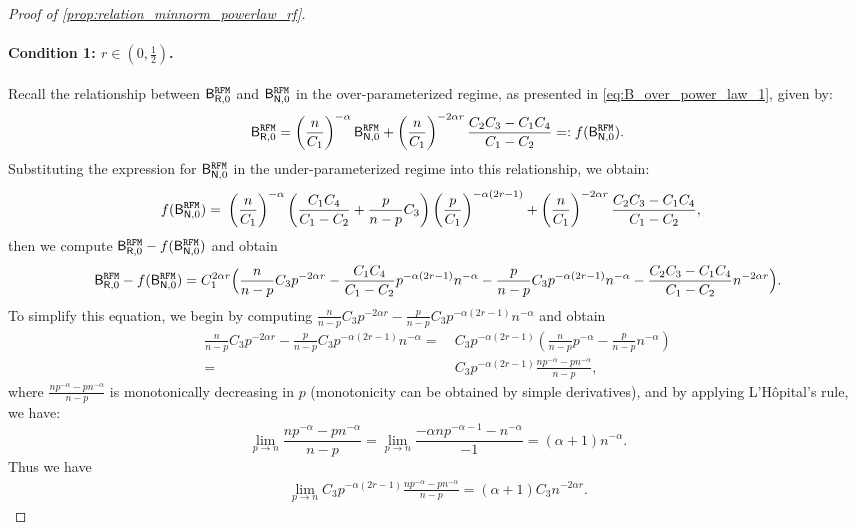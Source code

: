 \begin{proof}[Proof of \cref{prop:relation_minnorm_powerlaw_rf}]
\paragraph{Condition 1: $r \in (0, \frac{1}{2})$.}
Recall the relationship between $\mathsf B_{\mathsf R,0}^{\tt RFM}$ and $\mathsf B_{\mathsf N,0}^{\tt RFM}$ in the over-parameterized regime, as presented in \cref{eq:B_over_power_law_1}, given by: 
\[
\begin{aligned}
\mathsf B_{\mathsf R,0}^{\tt RFM} = \left(\frac{n}{C_1}\right)^{-\alpha} \mathsf B_{\mathsf N,0}^{\tt RFM} + \left(\frac{n}{C_1}\right)^{-2\alpha r}\frac{C_2C_3-C_1C_4}{C_1-C_2} =: f(\mathsf B_{\mathsf N,0}^{\tt RFM}).
\end{aligned}
\]
Substituting the expression for $\mathsf B_{\mathsf N,0}^{\tt RFM}$ in the under-parameterized regime into this relationship, we obtain:
\[
\begin{aligned}
f(\mathsf B_{\mathsf N,0}^{\tt RFM}) =&~ \left(\frac{n}{C_1}\right)^{-\alpha} \left(\frac{C_1C_4}{C_1-C_2}+\frac{p}{n-p}C_3\right) \left(\frac{p}{C_1}\right)^{-\alpha(2r-1)} + \left(\frac{n}{C_1}\right)^{-2\alpha r}\frac{C_2C_3-C_1C_4}{C_1-C_2},
\end{aligned}
\]
then we compute $\mathsf B_{\mathsf R,0}^{\tt RFM} - f(\mathsf B_{\mathsf N,0}^{\tt RFM})$ and obtain
\[
\begin{aligned}
\mathsf B_{\mathsf R,0}^{\tt RFM} - f(\mathsf B_{\mathsf N,0}^{\tt RFM}) = C_1^{2\alpha r}\Big(\frac{n}{n-p}C_3p^{-2\alpha r} - \frac{C_1C_4}{C_1-C_2}p^{-\alpha(2r-1)}n^{-\alpha} -\frac{p}{n-p}C_3p^{-\alpha(2r-1)}n^{-\alpha} - \frac{C_2C_3-C_1C_4}{C_1-C_2}n^{-2\alpha r}\Big).\\
\end{aligned}
\]
To simplify this equation, we begin by computing $\frac{n}{n-p}C_3p^{-2\alpha r} - \frac{p}{n-p}C_3p^{-\alpha(2r-1)}n^{-\alpha}$ and obtain
\[
\begin{aligned}
\frac{n}{n-p}C_3p^{-2\alpha r} - \frac{p}{n-p}C_3p^{-\alpha(2r-1)}n^{-\alpha} =&~ C_3p^{-\alpha(2r-1)} \left(\frac{n}{n-p}p^{-\alpha} - \frac{p}{n-p}n^{-\alpha} \right)\\
=&~ C_3p^{-\alpha(2r-1)}\frac{np^{-\alpha} - pn^{-\alpha}}{n-p},
\end{aligned}
\]
where $\frac{np^{-\alpha} - pn^{-\alpha}}{n-p}$ is monotonically decreasing in $p$ (monotonicity can be obtained by simple derivatives), and by applying L'Hôpital's rule, we have:
\[
\lim_{p \to n} \frac{np^{-\alpha} - pn^{-\alpha}}{n-p} = \lim_{p \to n} \frac{-\alpha n p^{-\alpha-1}-n^{-\alpha}}{-1} = (\alpha+1)n^{-\alpha}.
\]
Thus we have
\[
\begin{aligned}
\lim_{p \to n} C_3p^{-\alpha(2r-1)}\frac{np^{-\alpha} - pn^{-\alpha}}{n-p} = (\alpha+1)C_3n^{-2\alpha r}.

\end{aligned}\]
\end{proof}
